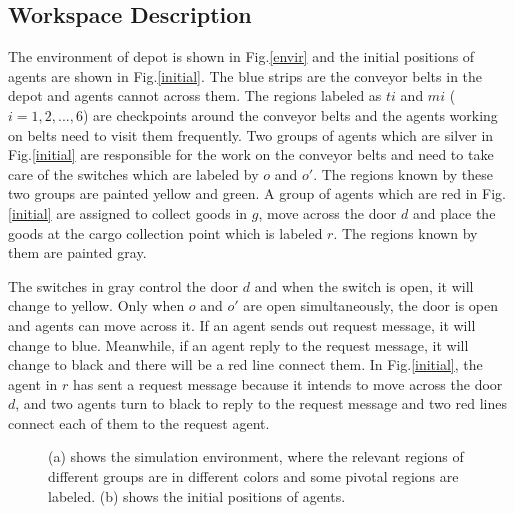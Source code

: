 \documentclass[journal]{IEEEtran}
\begin{document}
\subsection{Workspace Description}
The environment of depot is shown in Fig.\ref{envir} and the initial positions of agents are shown in Fig.\ref{initial}. The blue strips are the conveyor belts in the depot and agents cannot across them. The regions labeled as $ti$ and $mi$ ($i=1,2,...,6$) are checkpoints around the conveyor belts and the agents working on belts need to visit them frequently. Two groups of agents which are silver in Fig.\ref{initial} are responsible for the work on the conveyor belts and need to take care of the switches which are labeled by $o$ and $o'$. The regions known by these two groups are painted yellow and green. A group of agents which are red in Fig.\ref{initial} are assigned to collect goods in $g$, move across the door $d$ and place the goods at the cargo collection point which is labeled $r$. The regions known by them are painted gray.\par
The switches in gray control the door $d$ and when the switch is open, it will change to yellow. Only when $o$ and $o'$ are open simultaneously, the door is open and agents can move across it. If an agent sends out request message, it will change to blue. Meanwhile, if an agent reply to the request message, it will change to black and there will be a red line connect them. In Fig.\ref{initial}, the agent in $r$ has sent a request message because it intends to move across the door $d$, and two agents turn to black to reply to the request message and two red lines connect each of them to the request agent.
\begin{figure}
\centering
{}
\hspace{0.3in}
\caption{(a) shows the simulation environment, where the relevant regions of different groups are in different colors and some pivotal regions are labeled. (b) shows the initial positions of agents.}
\label{first}
\end{figure}
\end{document}
